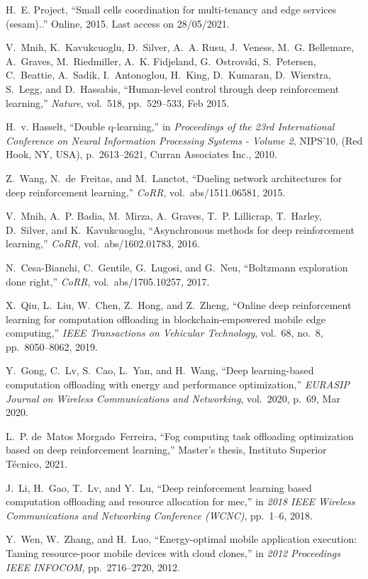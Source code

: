 \documentclass[conference]{IEEEtran}
\begin{document}
\begin{thebibliography}{1}
H.~E. Project, ``Small cells coordination for multi-tenancy and edge services
  (sesam)..'' Online, 2015.
\newblock Last access on 28/05/2021.

V.~Mnih, K.~Kavukcuoglu, D.~Silver, A.~A. Rusu, J.~Veness, M.~G. Bellemare,
  A.~Graves, M.~Riedmiller, A.~K. Fidjeland, G.~Ostrovski, S.~Petersen,
  C.~Beattie, A.~Sadik, I.~Antonoglou, H.~King, D.~Kumaran, D.~Wierstra,
  S.~Legg, and D.~Hassabis, ``Human-level control through deep reinforcement
  learning,'' {\em Nature}, vol.~518, pp.~529--533, Feb 2015.

H.~v. Hasselt, ``Double q-learning,'' in {\em Proceedings of the 23rd
  International Conference on Neural Information Processing Systems - Volume
  2}, NIPS'10, (Red Hook, NY, USA), p.~2613–2621, Curran Associates Inc.,
  2010.

Z.~Wang, N.~de~Freitas, and M.~Lanctot, ``Dueling network architectures for
  deep reinforcement learning,'' {\em CoRR}, vol.~abs/1511.06581, 2015.

V.~Mnih, A.~P. Badia, M.~Mirza, A.~Graves, T.~P. Lillicrap, T.~Harley,
  D.~Silver, and K.~Kavukcuoglu, ``Asynchronous methods for deep reinforcement
  learning,'' {\em CoRR}, vol.~abs/1602.01783, 2016.

N.~Cesa{-}Bianchi, C.~Gentile, G.~Lugosi, and G.~Neu, ``Boltzmann exploration
  done right,'' {\em CoRR}, vol.~abs/1705.10257, 2017.

X.~Qiu, L.~Liu, W.~Chen, Z.~Hong, and Z.~Zheng, ``Online deep reinforcement
  learning for computation offloading in blockchain-empowered mobile edge
  computing,'' {\em IEEE Transactions on Vehicular Technology}, vol.~68, no.~8,
  pp.~8050--8062, 2019.

Y.~Gong, C.~Lv, S.~Cao, L.~Yan, and H.~Wang, ``Deep learning-based computation
  offloading with energy and performance optimization,'' {\em EURASIP Journal
  on Wireless Communications and Networking}, vol.~2020, p.~69, Mar 2020.

L.~P. de~Matos Morgado~Ferreira, ``Fog computing task offloading optimization
  based on deep reinforcement learning,'' Master's thesis, Instituto Superior
  Técnico, 2021.

J.~Li, H.~Gao, T.~Lv, and Y.~Lu, ``Deep reinforcement learning based
  computation offloading and resource allocation for mec,'' in {\em 2018 IEEE
  Wireless Communications and Networking Conference (WCNC)}, pp.~1--6, 2018.

Y.~Wen, W.~Zhang, and H.~Luo, ``Energy-optimal mobile application execution:
  Taming resource-poor mobile devices with cloud clones,'' in {\em 2012
  Proceedings IEEE INFOCOM}, pp.~2716--2720, 2012.

\end{thebibliography}
\end{document}
